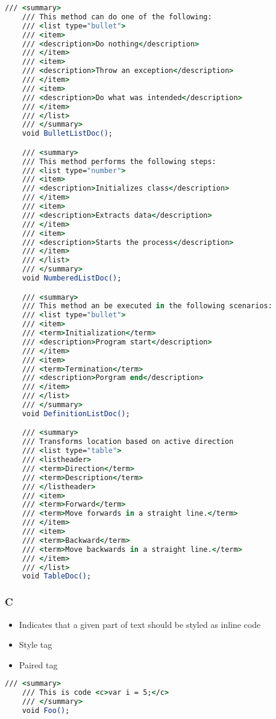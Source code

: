 \begin{lstlisting}[language=csh]
    /// <summary>
    /// This method can do one of the following:
    /// <list type="bullet">
    /// <item>
    /// <description>Do nothing</description>
    /// </item>
    /// <item>
    /// <description>Throw an exception</description>
    /// </item>
    /// <item>
    /// <description>Do what was intended</description>
    /// </item>
    /// </list>
    /// </summary>
    void BulletListDoc();

    /// <summary>
    /// This method performs the following steps:
    /// <list type="number">
    /// <item>
    /// <description>Initializes class</description>
    /// </item>
    /// <item>
    /// <description>Extracts data</description>
    /// </item>
    /// <item>
    /// <description>Starts the process</description>
    /// </item>
    /// </list>
    /// </summary>
    void NumberedListDoc();

    /// <summary>
    /// This method an be executed in the following scenarios:
    /// <list type="bullet">
    /// <item>
    /// <term>Initialization</term>
    /// <description>Program start</description>
    /// </item>
    /// <item>
    /// <term>Termination</term>
    /// <description>Porgram end</description>
    /// </item>
    /// </list>
    /// </summary>
    void DefinitionListDoc();

    /// <summary>
    /// Transforms location based on active direction
    /// <list type="table">
    /// <listheader>
    /// <term>Direction</term>
    /// <term>Description</term>
    /// </listheader>
    /// <item>
    /// <term>Forward</term>
    /// <term>Move forwards in a straight line.</term>
    /// </item>
    /// <item>
    /// <term>Backward</term>
    /// <term>Move backwards in a straight line.</term>
    /// </item>
    /// </list>
    void TableDoc();
\end{lstlisting}

\subsubsection*{C}
\begin{itemize}
    \item Indicates that a given part of text should be styled as inline code
    \item Style tag
    \item Paired tag
\end{itemize}

\begin{lstlisting}[language=csh]
    /// <summary>
    /// This is code <c>var i = 5;</c>
    /// </summary>
    void Foo();
\end{lstlisting}

